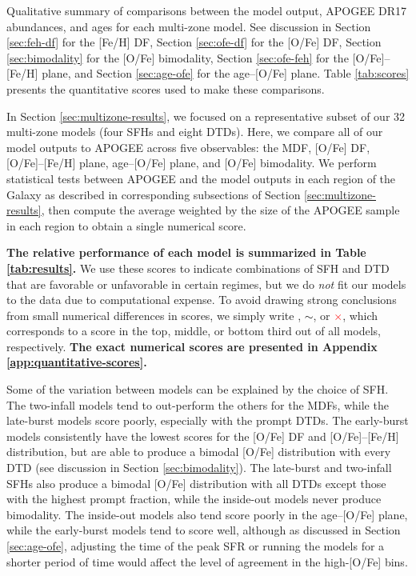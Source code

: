 \documentclass[twocolumn,twocolappendix,linenumbers]{aastex631}
\newcommand{\yes}{\textcolor{green}{\checkmark}\xspace}
\newcommand{\meh}{\textcolor{black}{$\sim$}\xspace}
\newcommand{\no}{\textcolor{red}{$\times$}\xspace}
\begin{document}
\begin{table*}
\centering
\caption{Qualitative summary of comparisons between the model output,
APOGEE DR17 abundances, and  ages for each multi-zone
model. See discussion in Section \ref{sec:feh-df} for the [Fe/H] DF, 
Section \ref{sec:ofe-df} for the [O/Fe] DF, Section \ref{sec:bimodality} for
the [O/Fe] bimodality, Section \ref{sec:ofe-feh} for the [O/Fe]--[Fe/H] plane,
and Section \ref{sec:age-ofe} for the age--[O/Fe] plane. Table \ref{tab:scores}
presents the quantitative scores used to make these comparisons.}
\label{tab:results}
\end{table*}

In Section \ref{sec:multizone-results}, we focused on a representative subset of our 32 multi-zone models (four SFHs and eight DTDs). Here, we compare all of our model outputs to APOGEE across five observables: the MDF, [O/Fe] DF, [O/Fe]--[Fe/H] plane, age--[O/Fe] plane, and [O/Fe] bimodality. We perform statistical tests between APOGEE and the model outputs in each region of the Galaxy as described in corresponding subsections of Section \ref{sec:multizone-results}, then compute the average weighted by the size of the APOGEE sample in each region to obtain a single numerical score.

{\bf The relative performance of each model is summarized in Table \ref{tab:results}.} We use these scores to indicate combinations of SFH and DTD that are favorable or unfavorable in certain regimes, but we do {\it not} fit our models to the data due to computational expense. To avoid drawing strong conclusions from small numerical differences in scores, we simply write \yes, \meh, or \no, which corresponds to a score in the top, middle, or bottom third out of all models, respectively. {\bf The exact numerical scores are presented in Appendix \ref{app:quantitative-scores}.}

Some of the variation between models can be explained by the choice of SFH. The two-infall models tend to out-perform the others for the MDFs, while the late-burst models score poorly, especially with the prompt DTDs. The early-burst models consistently have the lowest scores for the [O/Fe] DF and [O/Fe]--[Fe/H] distribution, but are able to produce a bimodal [O/Fe] distribution with every DTD (see discussion in Section \ref{sec:bimodality}). The late-burst and two-infall SFHs also produce a bimodal [O/Fe] distribution with all DTDs except those with the highest prompt fraction, while the inside-out models never produce bimodality. The inside-out models also tend score poorly in the age--[O/Fe] plane, while the early-burst models tend to score well, although as discussed in Section \ref{sec:age-ofe}, adjusting the time of the peak SFR or running the models for a shorter period of time would affect the level of agreement in the high-[O/Fe] bins.
\end{document}
